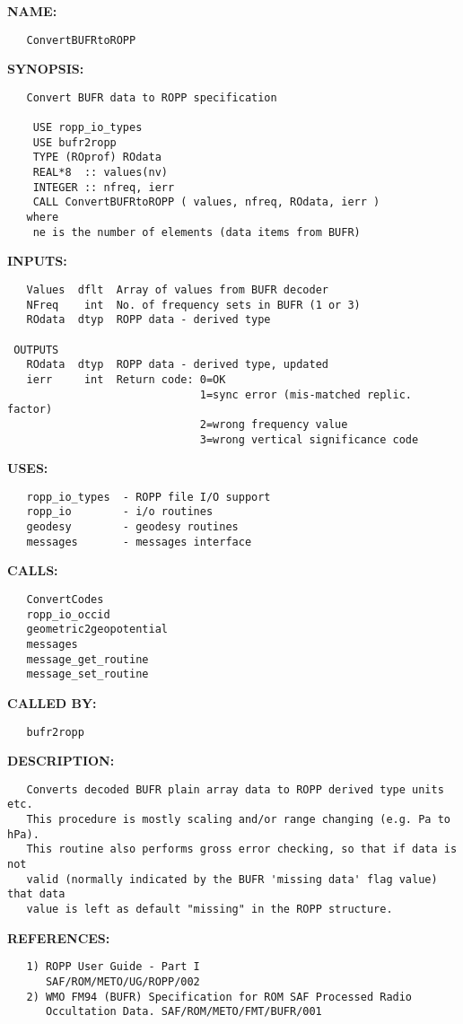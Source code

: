 \label{ch:robo15}
\label{ch:bufr2ropp_ConvertBUFRtoROPP}
\textbf{NAME:}\hspace{0.08in}\begin{Verbatim}
   ConvertBUFRtoROPP
\end{Verbatim}
\textbf{SYNOPSIS:}\hspace{0.08in}\begin{Verbatim}
   Convert BUFR data to ROPP specification

    USE ropp_io_types
    USE bufr2ropp
    TYPE (ROprof) ROdata
    REAL*8  :: values(nv)
    INTEGER :: nfreq, ierr
    CALL ConvertBUFRtoROPP ( values, nfreq, ROdata, ierr )
   where
    ne is the number of elements (data items from BUFR)
\end{Verbatim}
\textbf{INPUTS:}\hspace{0.08in}\begin{Verbatim}
   Values  dflt  Array of values from BUFR decoder
   NFreq    int  No. of frequency sets in BUFR (1 or 3)
   ROdata  dtyp  ROPP data - derived type

 OUTPUTS
   ROdata  dtyp  ROPP data - derived type, updated
   ierr     int  Return code: 0=OK
                              1=sync error (mis-matched replic. factor)
                              2=wrong frequency value
                              3=wrong vertical significance code
\end{Verbatim}
\textbf{USES:}\hspace{0.08in}\begin{Verbatim}
   ropp_io_types  - ROPP file I/O support
   ropp_io        - i/o routines
   geodesy        - geodesy routines
   messages       - messages interface
\end{Verbatim}
\textbf{CALLS:}\hspace{0.08in}\begin{Verbatim}
   ConvertCodes
   ropp_io_occid
   geometric2geopotential
   messages
   message_get_routine
   message_set_routine
\end{Verbatim}
\textbf{CALLED BY:}\hspace{0.08in}\begin{Verbatim}
   bufr2ropp
\end{Verbatim}
\textbf{DESCRIPTION:}\hspace{0.08in}\begin{Verbatim}
   Converts decoded BUFR plain array data to ROPP derived type units etc.
   This procedure is mostly scaling and/or range changing (e.g. Pa to hPa).
   This routine also performs gross error checking, so that if data is not
   valid (normally indicated by the BUFR 'missing data' flag value) that data
   value is left as default "missing" in the ROPP structure.
\end{Verbatim}
\textbf{REFERENCES:}\hspace{0.08in}\begin{Verbatim}
   1) ROPP User Guide - Part I
      SAF/ROM/METO/UG/ROPP/002
   2) WMO FM94 (BUFR) Specification for ROM SAF Processed Radio
      Occultation Data. SAF/ROM/METO/FMT/BUFR/001
\end{Verbatim}
